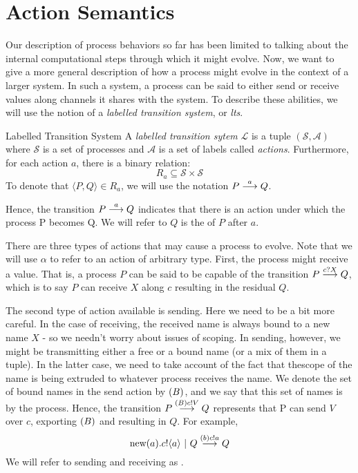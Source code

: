 \section{Action Semantics}
Our description of process behaviors so far has been limited to talking about the internal computational steps through which it might evolve.  Now, we want to give a more general description of how a process might evolve in the context of a larger system.  In such a system, a process can be said to either send or receive values along channels it shares with the system.  To describe these abilities, we will use the notion of a \emph{labelled transition system}, or \emph{lts}.

\begin{definition}{Labelled Transition System}
	A \emph{labelled transition sytem} $\mathcal{L}$ is a tuple $(\mathcal{S}, \mathcal{A})$ 
where $\mathcal{S}$ is a set of processes and $\mathcal{A}$ is a set of labels called \emph{actions}.  Furthermore, for each action $a$, there is a binary relation:
	\[
		R_a \subseteq \mathcal{S} \times \mathcal{S}
	\]
	To denote that $\langle P,Q\rangle \in R_a$, we will use the notation $P \overset{{a}}{\longrightarrow} Q$.
\end{definition}
Hence, the transition $P \overset{{a}}{\longrightarrow} Q$ indicates that there is an action under which the process P becomes Q.  We will refer to $Q$ is the  of $P$ after $a$.

There are three types of actions that may cause a process to evolve.  Note that we will use $\alpha$ to refer to an action of arbitrary type.  First, the process might receive a value.  That is, a process $P$ can be said to be capable of the transition $P \overset{{{c}?{X}}}{\longrightarrow} Q$, which is to say $P$ can receive $X$ along $c$ resulting in the residual $Q$.

The second type of action available is sending.  Here we need to be a bit more careful.  In the case of receiving, the received name is always bound to a new name $X$ - so we needn't worry about issues of scoping.  In sending, however, we might be transmitting either a free or a bound name (or a mix of them in a tuple).  In the latter case, we need to take account of the fact that thescope of the name is being extruded to whatever process receives the name.  We denote the set of bound names in the send action by $({B})$, and we say that this set of names is  by the process.  Hence, the transition $P \overset{{({B}){c}!{V}}}{\longrightarrow} Q$ represents that P can send $V$ over $c$, exporting $({B})$ and resulting in $Q$.  For example,
\[
	\text{new}({a}).{c}!\langle{a}\rangle \ |\  Q \overset{{({b}){c}!{a}}}{\longrightarrow} Q
\]
We will refer to sending and receiving as .

